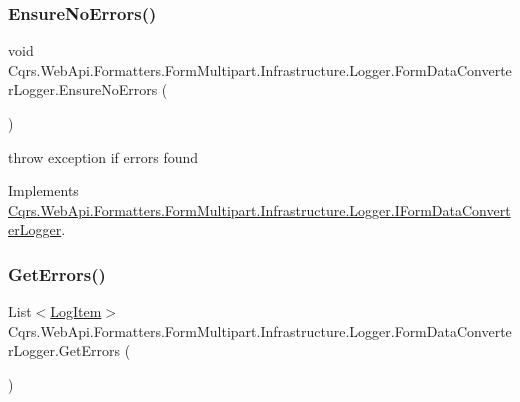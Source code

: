\subsubsection{\texorpdfstring{Ensure\+No\+Errors()}{EnsureNoErrors()}}
{\footnotesize\ttfamily void Cqrs.\+Web\+Api.\+Formatters.\+Form\+Multipart.\+Infrastructure.\+Logger.\+Form\+Data\+Converter\+Logger.\+Ensure\+No\+Errors (\begin{DoxyParamCaption}{ }\end{DoxyParamCaption})}



throw exception if errors found 



Implements \hyperlink{interfaceCqrs_1_1WebApi_1_1Formatters_1_1FormMultipart_1_1Infrastructure_1_1Logger_1_1IFormDataConverterLogger_a53cf31f01e5ceb5efcc8ed3d874c319a_a53cf31f01e5ceb5efcc8ed3d874c319a}{Cqrs.\+Web\+Api.\+Formatters.\+Form\+Multipart.\+Infrastructure.\+Logger.\+I\+Form\+Data\+Converter\+Logger}.

\mbox{\label{classCqrs_1_1WebApi_1_1Formatters_1_1FormMultipart_1_1Infrastructure_1_1Logger_1_1FormDataConverterLogger_a5cdd85325e839d1238b0384fba15f595_a5cdd85325e839d1238b0384fba15f595}} 
\subsubsection{\texorpdfstring{Get\+Errors()}{GetErrors()}}
{\footnotesize\ttfamily List$<$\hyperlink{classCqrs_1_1WebApi_1_1Formatters_1_1FormMultipart_1_1Infrastructure_1_1Logger_1_1FormDataConverterLogger_1_1LogItem}{Log\+Item}$>$ Cqrs.\+Web\+Api.\+Formatters.\+Form\+Multipart.\+Infrastructure.\+Logger.\+Form\+Data\+Converter\+Logger.\+Get\+Errors (\begin{DoxyParamCaption}{ }\end{DoxyParamCaption})}

